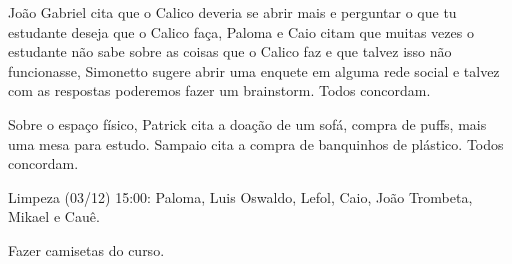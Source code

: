 \documentclass{ata-calico}
\begin{document}
João Gabriel cita que o Calico deveria se abrir mais e perguntar o que tu estudante
deseja que o Calico faça, Paloma e Caio citam que muitas vezes o estudante não sabe
sobre as coisas que o Calico faz e que talvez isso não funcionasse, Simonetto sugere
abrir uma enquete em alguma rede social e talvez com as respostas poderemos fazer um 
brainstorm. Todos concordam.

Sobre o espaço físico, Patrick cita a doação de um sofá, compra de puffs, mais uma mesa para estudo. Sampaio cita a compra de banquinhos de plástico. Todos concordam.

Limpeza (03/12) 15:00: Paloma, Luis Oswaldo, Lefol, Caio, João Trombeta, Mikael e Cauê.

Fazer camisetas do curso.

\end{document}
